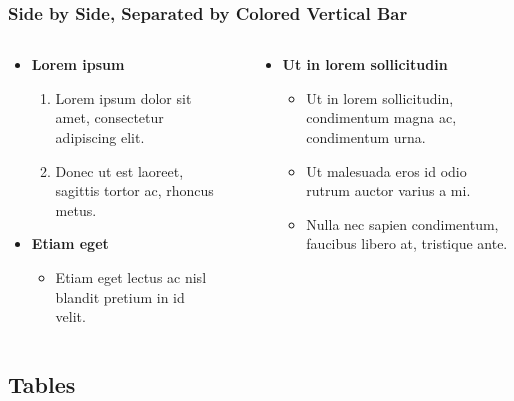\documentclass[english,hangout]{beamer}
\begin{document}
\begin{frame}
\frametitle{Side by Side, Separated by Colored Vertical Bar}
\begin{columns}[onlytextwidth]
\begin{column}{.5\textwidth}
\begin{itemize}
\item \textbf{Lorem ipsum} 
\begin{enumerate}
\item Lorem ipsum dolor sit amet, consectetur adipiscing elit.
\item Donec ut est laoreet, sagittis tortor ac, rhoncus metus.
\end{enumerate}
\item \textbf{Etiam eget} 
\begin{itemize}
\item Etiam eget lectus ac nisl blandit pretium in id velit.
\end{itemize}
\end{itemize}
\end{column}
\textcolor{FrankfurtUniversityColor}{\vrule{}}
\begin{column}{.5\textwidth}
\begin{itemize}
\item \textbf{Ut in lorem sollicitudin}
\begin{itemize}
\item Ut in lorem sollicitudin, condimentum magna ac, condimentum urna.
\item Ut malesuada eros id odio rutrum auctor varius a mi.
\item Nulla nec sapien condimentum, faucibus libero at, tristique ante.
\end{itemize}
\end{itemize}
\end{column}
\end{columns}
\end{frame}



\subsection{Tables}
\end{document}
